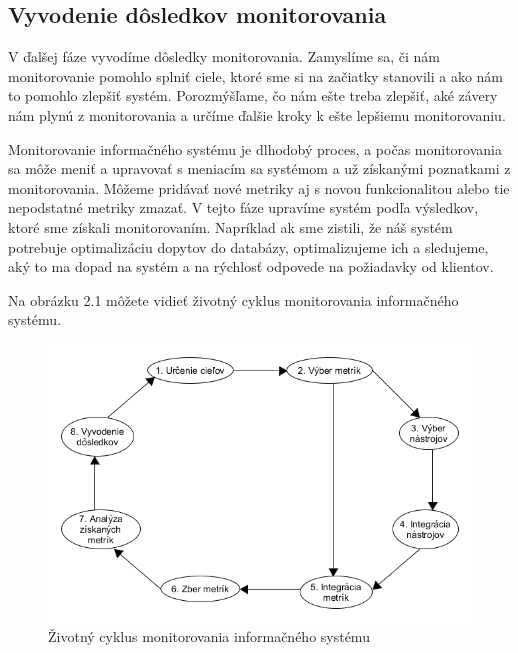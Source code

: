 \documentclass[a4paper, upjsfrontpage, disablespecwarning, thesismargins, thesislinespacing]{rnthesis}
\begin{document}
\subsection*{Vyvodenie dôsledkov monitorovania}

V ďalšej fáze vyvodíme dôsledky monitorovania.
Zamyslíme sa, či nám monitorovanie pomohlo splniť ciele, ktoré sme si na začiatky stanovili a ako nám to pomohlo zlepšiť systém.
Porozmýšľame, čo nám ešte treba zlepšiť, aké závery nám plynú z monitorovania a určíme ďalšie kroky k ešte lepšiemu monitorovaniu.

Monitorovanie informačného systému je dlhodobý proces, a počas monitorovania sa môže meniť a upravovať s meniacím sa systémom a už získanými poznatkami z monitorovania.
Môžeme pridávať nové metriky aj s novou funkcionalitou alebo tie nepodstatné metriky zmazať.
V tejto fáze upravíme systém podľa výsledkov, ktoré sme získali monitorovaním.
Napríklad ak sme zistili, že náš systém potrebuje optimalizáciu dopytov do databázy, optimalizujeme ich a sledujeme, aký to ma dopad na systém a na rýchlosť odpovede na požiadavky od klientov.

Na obrázku 2.1 môžete vidieť životný cyklus monitorovania informačného systému.

\begin{figure}
\begin{center}
\includegraphics[scale=0.7]{ais_algorithm.png}
\caption{Životný cyklus monitorovania informačného systému}
\end{center}
\end{figure}

\newpage

\end{document}
